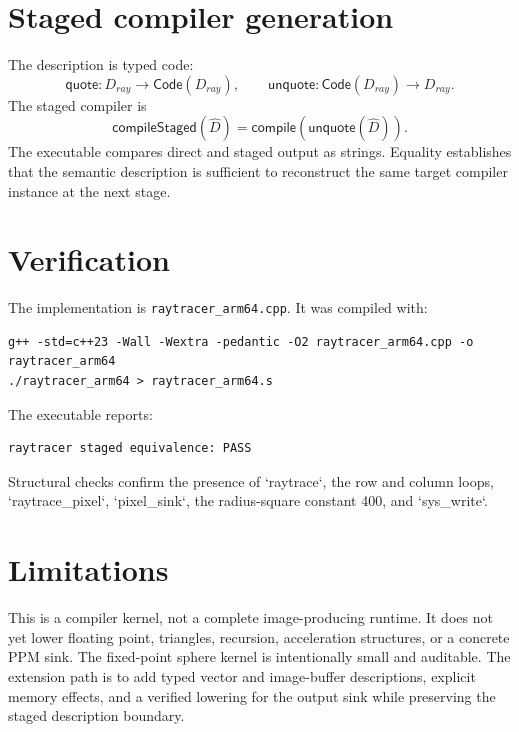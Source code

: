 \documentclass[11pt,a4paper]{article}
\begin{document}
\section{Staged compiler generation}
The description is typed code:
\[
\mathsf{quote}:D_{ray}\to\mathsf{Code}(D_{ray}),
\qquad
\mathsf{unquote}:\mathsf{Code}(D_{ray})\to D_{ray}.
\]
The staged compiler is
\[
\mathsf{compileStaged}(\widehat D)=
\mathsf{compile}(\mathsf{unquote}(\widehat D)).
\]
The executable compares direct and staged output as strings. Equality establishes that the semantic description is sufficient to reconstruct the same target compiler instance at the next stage.

\section{Verification}
The implementation is \texttt{raytracer\_arm64.cpp}. It was compiled with:
\begin{verbatim}
g++ -std=c++23 -Wall -Wextra -pedantic -O2 raytracer_arm64.cpp -o raytracer_arm64
./raytracer_arm64 > raytracer_arm64.s
\end{verbatim}
The executable reports:
\begin{verbatim}
raytracer staged equivalence: PASS
\end{verbatim}
Structural checks confirm the presence of `raytrace`, the row and column loops, `raytrace\_pixel`, `pixel\_sink`, the radius-square constant 400, and `sys\_write`.

\section{Limitations}
This is a compiler kernel, not a complete image-producing runtime. It does not yet lower floating point, triangles, recursion, acceleration structures, or a concrete PPM sink. The fixed-point sphere kernel is intentionally small and auditable. The extension path is to add typed vector and image-buffer descriptions, explicit memory effects, and a verified lowering for the output sink while preserving the staged description boundary.
\end{document}
